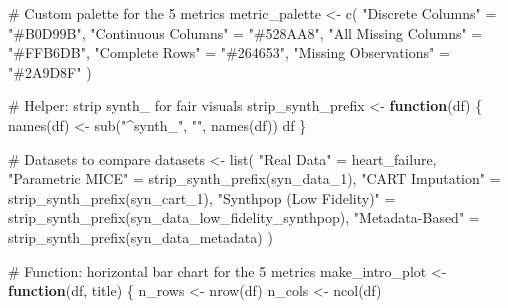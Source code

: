 \documentclass[
  letterpaper,
  DIV=11,
  numbers=noendperiod]{scrartcl}
\newenvironment{Shaded}{\begin{snugshade}}{\end{snugshade}}
\newcommand{\CommentTok}[1]{\textcolor[rgb]{0.37,0.37,0.37}{#1}}
\newcommand{\ControlFlowTok}[1]{\textcolor[rgb]{0.00,0.23,0.31}{\textbf{#1}}}
\newcommand{\FunctionTok}[1]{\textcolor[rgb]{0.28,0.35,0.67}{#1}}
\newcommand{\NormalTok}[1]{\textcolor[rgb]{0.00,0.23,0.31}{#1}}
\newcommand{\OtherTok}[1]{\textcolor[rgb]{0.00,0.23,0.31}{#1}}
\newcommand{\StringTok}[1]{\textcolor[rgb]{0.13,0.47,0.30}{#1}}
\begin{document}
\begin{Shaded}
\begin{Highlighting}[]
\CommentTok{\# Custom palette for the 5 metrics}
\NormalTok{metric\_palette }\OtherTok{\textless{}{-}} \FunctionTok{c}\NormalTok{(}
  \StringTok{"Discrete Columns"}     \OtherTok{=} \StringTok{"\#B0D99B"}\NormalTok{,}
  \StringTok{"Continuous Columns"}   \OtherTok{=} \StringTok{"\#528AA8"}\NormalTok{,}
  \StringTok{"All Missing Columns"}  \OtherTok{=} \StringTok{"\#FFB6DB"}\NormalTok{,}
  \StringTok{"Complete Rows"}        \OtherTok{=} \StringTok{"\#264653"}\NormalTok{,}
  \StringTok{"Missing Observations"} \OtherTok{=} \StringTok{"\#2A9D8F"}
\NormalTok{)}

\CommentTok{\# Helper: strip \textquotesingle{}synth\_\textquotesingle{} for fair visuals}
\NormalTok{strip\_synth\_prefix }\OtherTok{\textless{}{-}} \ControlFlowTok{function}\NormalTok{(df) \{ }
  \FunctionTok{names}\NormalTok{(df) }\OtherTok{\textless{}{-}} \FunctionTok{sub}\NormalTok{(}\StringTok{"\^{}synth\_"}\NormalTok{, }\StringTok{""}\NormalTok{, }\FunctionTok{names}\NormalTok{(df)) }
\NormalTok{  df }
\NormalTok{\}}

\CommentTok{\# Datasets to compare}
\NormalTok{datasets }\OtherTok{\textless{}{-}} \FunctionTok{list}\NormalTok{(}
  \StringTok{"Real Data"}               \OtherTok{=}\NormalTok{ heart\_failure,}
  \StringTok{"Parametric MICE"}         \OtherTok{=} \FunctionTok{strip\_synth\_prefix}\NormalTok{(syn\_data\_1),}
  \StringTok{"CART Imputation"}         \OtherTok{=} \FunctionTok{strip\_synth\_prefix}\NormalTok{(syn\_cart\_1),}
  \StringTok{"Synthpop (Low Fidelity)"} \OtherTok{=} \FunctionTok{strip\_synth\_prefix}\NormalTok{(syn\_data\_low\_fidelity\_synthpop),}
  \StringTok{"Metadata{-}Based"}          \OtherTok{=} \FunctionTok{strip\_synth\_prefix}\NormalTok{(syn\_data\_metadata)}
\NormalTok{)}

\CommentTok{\# Function: horizontal bar chart for the 5 metrics}
\NormalTok{make\_intro\_plot }\OtherTok{\textless{}{-}} \ControlFlowTok{function}\NormalTok{(df, title) \{}
\NormalTok{  n\_rows }\OtherTok{\textless{}{-}} \FunctionTok{nrow}\NormalTok{(df)}
\NormalTok{  n\_cols }\OtherTok{\textless{}{-}} \FunctionTok{ncol}\NormalTok{(df)}


\end{Highlighting}
\end{Shaded}
\end{document}
